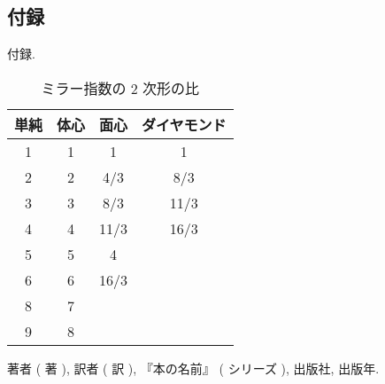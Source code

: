 \documentclass[dvipdfmx]{jsarticle}
\begin{document}
	\subsection{付録}
		付録.
		\clearpage
		\begin{table}[htb]
			\caption{ミラー指数の 2 次形の比}
			\centering
			\begin{tabular}{cccc}
				\hline
				単純 & 体心 & 面心 & ダイヤモンド \\
				\hline
				1 & 1 & 1 & 1 \\
				2 & 2 & 4/3 & 8/3 \\
				3 & 3 & 8/3 & 11/3 \\
				4 & 4 & 11/3 & 16/3 \\
				5 & 5 & 4 & \\
				6 & 6 & 16/3 & \\
				8 & 7 & & \\
				9 & 8 & & \\
				\hline
			\end{tabular}
		\end{table}
		\begin{comment}
			\begin{figure}[htb]
				\centering
				\texttt{[image: figure/A\_raw.jpg]}
				\caption{試料 A の測定結果}
			\end{figure}
		\end{comment}
		\begin{thebibliography}{9}
			 著者 ( 著 ), 訳者 ( 訳 ), 『本の名前』 ( シリーズ ), 出版社, 出版年.
		\end{thebibliography}
\end{document}
